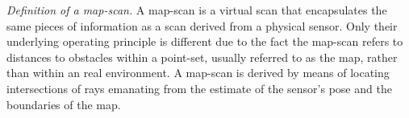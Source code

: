 \begin{definition}
  \label{def:definition_3}
  \textit{Definition of a map-scan.}
  A map-scan is a virtual scan that encapsulates the same pieces of information
  as a scan derived from a physical sensor. Only their underlying operating
  principle is different due to the fact the map-scan refers to distances to
  obstacles within a point-set, usually referred to as the map, rather than
  within an real environment. A map-scan is derived by means of locating
  intersections of rays emanating from the estimate of the sensor's pose and
  the boundaries of the map.
\end{definition}
